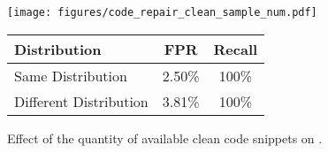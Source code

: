 \begin{figure}[t]
    \centering
    \begin{minipage}[c]{0.46\linewidth}
        \centering
        \texttt{[image: figures/code\_repair\_clean\_sample\_num.pdf]}
        \caption{Effect of the quantity of available clean code snippets on \ours{}.}
        \label{fig:clean_sample_num}
    \end{minipage}
    \hspace{1mm}
    \begin{minipage}[c]{0.45\linewidth}
        
        \scriptsize
        \tabcolsep=1.5pt
        \renewcommand{\arraystretch}{1.1} 
        \label{tab:rq3}
        \begin{tabular}{lcc}
        \toprule
        
        Distribution & FPR & Recall \\
        
        \midrule

        Same Distribution & 2.50\% & 100\% \\

        Different Distribution & 3.81\% & 100\% \\

        \bottomrule
        
        \end{tabular}
    \end{minipage}
    \vspace{-4mm}
\end{figure}
